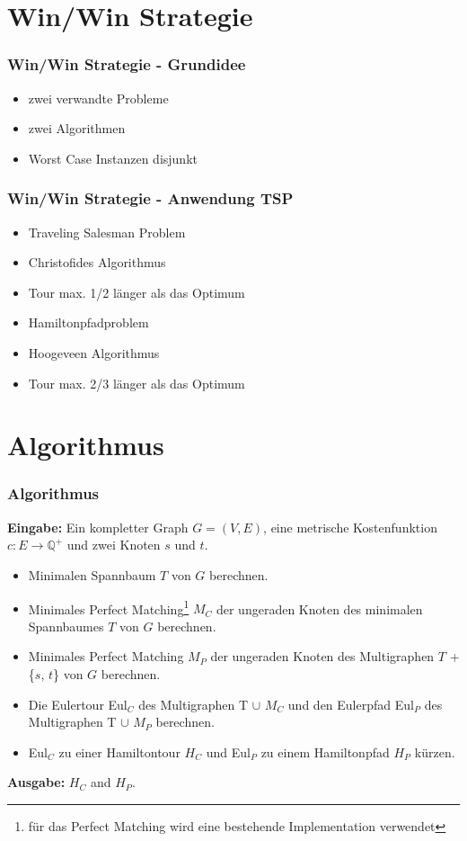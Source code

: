 \documentclass[12pt]{beamer}
\begin{document}
    \section{Win/Win Strategie}
    \begin{frame}
        \frametitle{Win/Win Strategie - Grundidee}
	    \begin{itemize}
                \item zwei verwandte Probleme
                \item zwei Algorithmen
                \item Worst Case Instanzen disjunkt
            \end{itemize}
    \end{frame}
    \begin{frame}
        \frametitle{Win/Win Strategie - Anwendung TSP}
	    \begin{itemize}
                \item Traveling Salesman Problem
                \item Christofides Algorithmus
                \item Tour max. 1/2 länger als das Optimum
                    \bigskip
                \item Hamiltonpfadproblem
                \item Hoogeveen Algorithmus 
                \item Tour max. 2/3 länger als das Optimum
            \end{itemize}
    \end{frame}
    \section{Algorithmus}
    \begin{frame}
    \frametitle{Algorithmus}
        \begin{scriptsize}
        \textbf{Eingabe:} Ein kompletter Graph $G = (V,E)$, eine metrische Kostenfunktion $c: E \rightarrow \mathbb{Q}^+$ und zwei Knoten $s$ und $t$.

        \begin{itemize}
            \item[1.] Minimalen Spannbaum $T$ von $G$ berechnen.
            \item[2.] Minimales Perfect Matching\footnote{für das Perfect Matching wird eine bestehende Implementation verwendet} $M_C$ der ungeraden Knoten des minimalen Spannbaumes $T$ von $G$ berechnen.
            \item[3.] Minimales Perfect Matching $M_P$ der ungeraden Knoten des Multigraphen $T$ + \{$s$, $t$\} von $G$ berechnen.
            \item[4.] Die Eulertour Eul$_C$ des Multigraphen T $\cup$ $M_C$ und den Eulerpfad Eul$_P$ des Multigraphen T $\cup$ $M_P$ berechnen.
            \item[6.] Eul$_C$ zu einer Hamiltontour $H_C$ und Eul$_P$ zu einem Hamiltonpfad $H_P$ kürzen.
        \end{itemize}
        \textbf{Ausgabe:} $H_C$ and $H_P$.
        \end{scriptsize}
    \end{frame}
\end{document}
